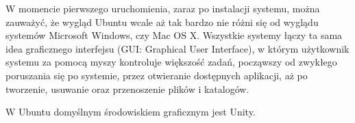 W momencie pierwszego uruchomienia, zaraz po instalacji systemu, można zauważyć, że wygląd Ubuntu wcale aż tak bardzo nie różni się od wyglądu systemów Microsoft Windows, czy Mac OS X. Wszystkie systemy łączy ta sama idea graficznego interfejsu (\textcolor{ubuntu_orange}{GUI: Graphical User Interface}), w którym użytkownik systemu za pomocą myszy kontroluje większość zadań, począwszy od zwykłego poruszania się po systemie, przez otwieranie dostępnych aplikacji, aż po tworzenie, usuwanie oraz przenoszenie plików i katalogów.

W Ubuntu domyślnym środowiskiem graficznym jest Unity.
